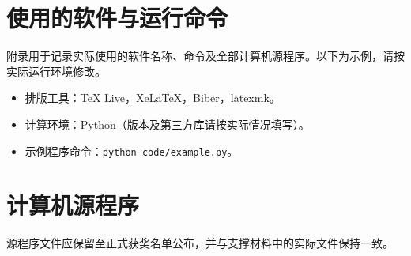 \section{使用的软件与运行命令}
附录用于记录实际使用的软件名称、命令及全部计算机源程序。以下为示例，请按实际运行环境修改。
\begin{itemize}
  \item 排版工具：TeX Live，XeLaTeX，Biber，latexmk。
  \item 计算环境：Python（版本及第三方库请按实际情况填写）。
  \item 示例程序命令：\texttt{python code/example.py}。
\end{itemize}

\section{计算机源程序}

源程序文件应保留至正式获奖名单公布，并与支撑材料中的实际文件保持一致。

